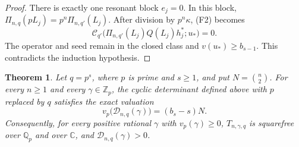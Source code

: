 \documentclass[11pt]{article}
\newtheorem{theorem}{Theorem}
\begin{document}
\begin{proof}
There is exactly one resonant block $e_j=0$. In this block,
$\Pi_{n,q}(pL_j)=p^n\Pi_{n,q'}(L_j)$.
After division by $p^n\kappa$, (F2) becomes
\[
 \mathcal C_{q'}\bigl(
       \Pi_{n,q'}(L_j)Q(L_j)h_j^*;u_*\bigr)=0.
\]
The operator and seed remain in the closed class and
$v(u_*)\ge b_{s-1}$. This contradicts the induction hypothesis.
\end{proof}

\begin{theorem}\label{thm:prime-power-lower-one}
Let $q=p^s$, where $p$ is prime and $s\ge1$, and put
$N=\binom n2$. For every $n\ge1$ and every $\gamma\in\mathbb Z_p$,
the cyclic determinant defined above with $p$ replaced by $q$
satisfies the exact valuation
\[
 v_p\bigl(\mathcal D_{n,q}(\gamma)\bigr)
       =(b_s-s)N.                                      \tag{F3}
\]
Consequently, for every positive rational $\gamma$ with
$v_p(\gamma)\ge0$, $T_{n,\gamma,q}$ is squarefree over
$\mathbb Q_p$ and over $\mathbb C$, and
$\mathcal D_{n,q}(\gamma)>0$.
\end{theorem}
\end{document}

